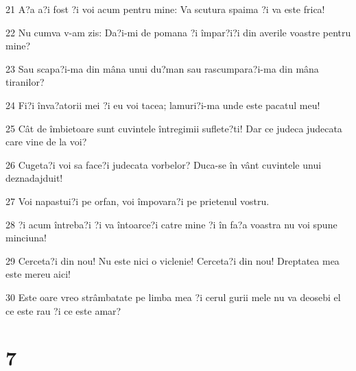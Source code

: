 \par 21 A?a a?i fost ?i voi acum pentru mine: Va scutura spaima ?i va este frica!
\par 22 Nu cumva v-am zis: Da?i-mi de pomana ?i împar?i?i din averile voastre pentru mine?
\par 23 Sau scapa?i-ma din mâna unui du?man sau rascumpara?i-ma din mâna tiranilor?
\par 24 Fi?i înva?atorii mei ?i eu voi tacea; lamuri?i-ma unde este pacatul meu!
\par 25 Cât de îmbietoare sunt cuvintele întregimii suflete?ti! Dar ce judeca judecata care vine de la voi?
\par 26 Cugeta?i voi sa face?i judecata vorbelor? Duca-se în vânt cuvintele unui deznadajduit!
\par 27 Voi napastui?i pe orfan, voi împovara?i pe prietenul vostru.
\par 28 ?i acum întreba?i ?i va întoarce?i catre mine ?i în fa?a voastra nu voi spune minciuna!
\par 29 Cerceta?i din nou! Nu este nici o viclenie! Cerceta?i din nou! Dreptatea mea este mereu aici!
\par 30 Este oare vreo strâmbatate pe limba mea ?i cerul gurii mele nu va deosebi el ce este rau ?i ce este amar?

\chapter{7}

